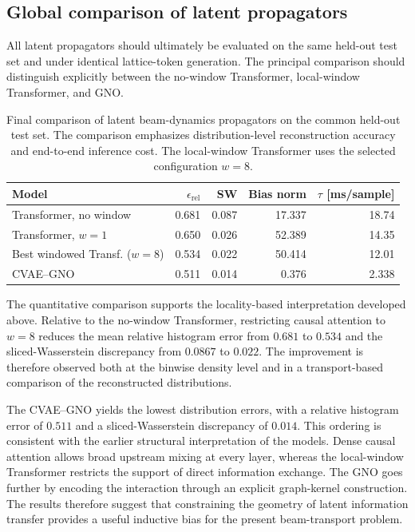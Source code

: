 \subsection{Global comparison of latent propagators}
\label{subsec:global_model_comparison}

All latent propagators should ultimately be evaluated on the same held-out test set and under identical lattice-token generation. The principal comparison should distinguish explicitly between the no-window Transformer, local-window Transformer, and GNO.

\begin{table}[H]
\centering
\caption{
Final comparison of latent beam-dynamics propagators on the common held-out test set. The comparison emphasizes distribution-level reconstruction accuracy and end-to-end inference cost. The local-window Transformer uses the selected configuration $w=8$.
}
\label{tab:global_model_comparison}
\begin{tabular}{lrrrr}
\toprule
Model & $\epsilon_{\text{rel}}$   & SW & Bias norm & $\tau$ [ms/sample] \\
\midrule
Transformer, no window & 0.681  & 0.087 & 17.337 & 18.74 \\
Transformer, $w=1$ & 0.650  & 0.026 & 52.389 & 14.35 \\
Best windowed Transf. ($w=8$) & 0.534 & 0.022 & 50.414 & 12.01 \\
CVAE--GNO & 0.511 & 0.014 & 0.376 & 2.338 \\
\bottomrule
\end{tabular}
\end{table}

The quantitative comparison supports the locality-based interpretation developed above. Relative to the no-window Transformer, restricting causal attention to $w=8$ reduces the mean relative histogram error from $0.681$ to $0.534$ and the sliced-Wasserstein discrepancy from $0.0867$ to $0.022$. The improvement is therefore observed both at the binwise density level and in a transport-based comparison of the reconstructed distributions.

The CVAE--GNO yields the lowest distribution errors, with a relative histogram error of $0.511$ and a sliced-Wasserstein discrepancy of $0.014$. This ordering is consistent with the earlier structural interpretation of the models. Dense causal attention allows broad upstream mixing at every layer, whereas the local-window Transformer restricts the support of direct information exchange. The GNO goes further by encoding the interaction through an explicit graph-kernel construction. The results therefore suggest that constraining the geometry of latent information transfer provides a useful inductive bias for the present beam-transport problem.

